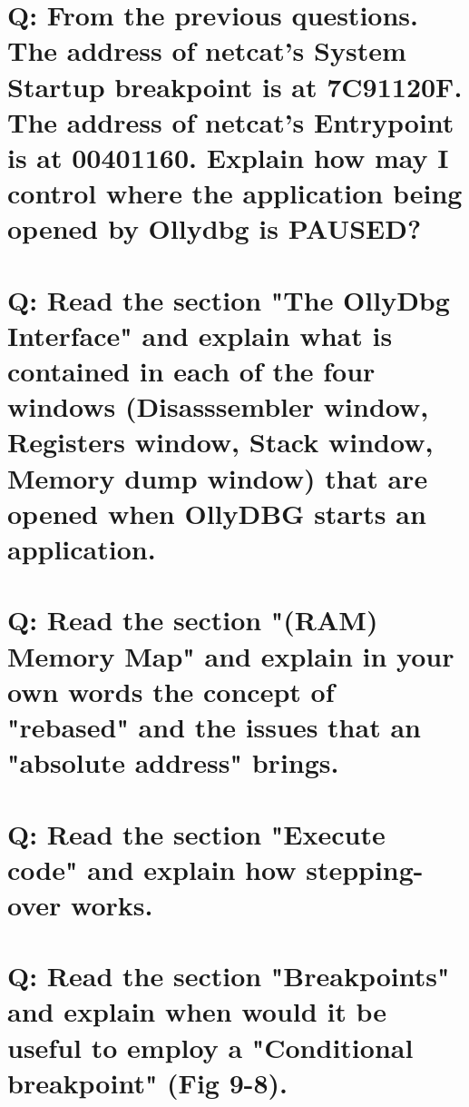 \documentclass[10pt,a4paper]{article} %
\begin{document}
    \section{Q: From the previous questions. The address of netcat's System
    Startup breakpoint is at 7C91120F. The address of netcat's Entrypoint is at
    00401160. Explain how may I control where the application being opened by
    Ollydbg is PAUSED?}




    \section{Q: Read the section "The OllyDbg Interface" and explain what is
    contained in each of the four windows (Disasssembler window, Registers
    window, Stack window, Memory dump window) that are opened when OllyDBG starts
    an application.}






    \section{Q: Read the section "(RAM) Memory Map" and explain in your own
    words the concept of "rebased" and the issues that an "absolute address"
    brings.}




    \section{Q: Read the section "Execute code" and explain how stepping-over
    works.}





    \section{Q: Read the section "Breakpoints" and explain when would it be
    useful to employ a "Conditional breakpoint" (Fig 9-8).}
\end{document}
